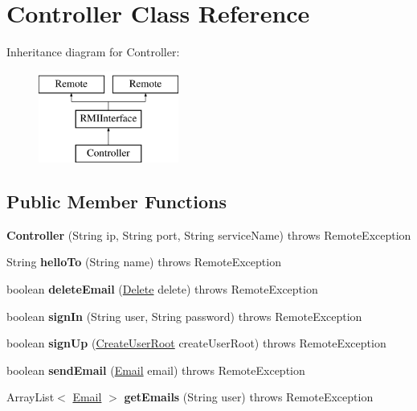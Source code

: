 \hypertarget{class_controller}{}\section{Controller Class Reference}
\label{class_controller}
Inheritance diagram for Controller\+:\begin{figure}[H]
\begin{center}
\leavevmode
\includegraphics[height=3.000000cm]{class_controller}
\end{center}
\end{figure}
\subsection*{Public Member Functions}
\begin{DoxyCompactItemize}
\item 
\mbox{\label{class_controller_a1479bbe8b34050fcc9c31f47fa29b71a}} 
{\bfseries Controller} (String ip, String port, String service\+Name)  throws Remote\+Exception 
\item 
\mbox{\label{class_controller_a32989980c784fc933af56f981d208ca1}} 
String {\bfseries hello\+To} (String name)  throws Remote\+Exception 
\item 
\mbox{\label{class_controller_ab681529b51d028c04978b1856f481809}} 
boolean {\bfseries delete\+Email} (\hyperlink{class_delete}{Delete} delete)  throws Remote\+Exception
\item 
\mbox{\label{class_controller_a8de8d716dde3d96111ef13686c91b10f}} 
boolean {\bfseries sign\+In} (String user, String password)  throws Remote\+Exception 
\item 
\mbox{\label{class_controller_aa4680640bce9264c99dd4cc928d31384}} 
boolean {\bfseries sign\+Up} (\hyperlink{class_create_user_root}{Create\+User\+Root} create\+User\+Root)  throws Remote\+Exception 
\item 
\mbox{\label{class_controller_a5f9217d932e5189ac91b54bde4136964}} 
boolean {\bfseries send\+Email} (\hyperlink{class_email}{Email} email)  throws Remote\+Exception 
\item 
\mbox{\label{class_controller_ab019b3e68c16d6be3c3e9a33ca11ba8f}} 
Array\+List$<$ \hyperlink{class_email}{Email} $>$ {\bfseries get\+Emails} (String user)  throws Remote\+Exception 
\end{DoxyCompactItemize}


